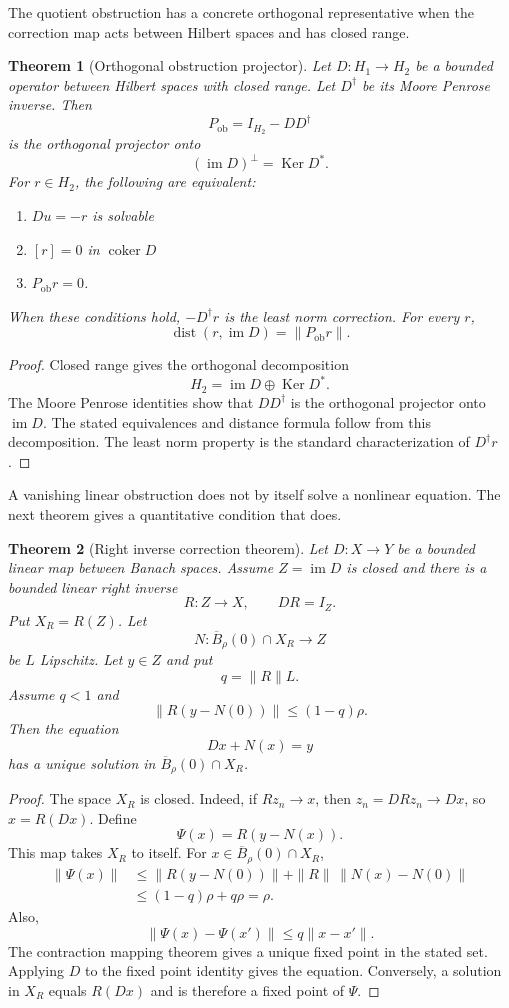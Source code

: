 \documentclass[11pt,a4paper]{article}
\newtheorem{theorem}{Theorem}[section]
\theoremstyle{plain}
\theoremstyle{definition}
\theoremstyle{remark}
\newcommand{\im}{\operatorname{im}}
\newcommand{\Ker}{\operatorname{Ker}}
\newcommand{\coker}{\operatorname{coker}}
\newcommand{\dist}{\operatorname{dist}}
\begin{document}
The quotient obstruction has a concrete orthogonal representative when the correction map acts between Hilbert spaces and has closed range.

\begin{theorem}[Orthogonal obstruction projector]\label{thm:orthogonal_obstruction}
Let $D:H_1\to H_2$ be a bounded operator between Hilbert spaces with closed range.  Let $D^\dagger$ be its Moore Penrose inverse.  Then
\[
P_{\mathrm{ob}}=I_{H_2}-DD^\dagger
\]
is the orthogonal projector onto
\[
(\im D)^\perp=\Ker D^*.
\]
For $r\in H_2$, the following are equivalent:
\begin{enumerate}
\item $Du=-r$ is solvable
\item $[r]=0$ in $\coker D$
\item $P_{\mathrm{ob}}r=0$.
\end{enumerate}
When these conditions hold, $-D^\dagger r$ is the least norm correction.  For every $r$,
\[
\dist(r,\im D)=\|P_{\mathrm{ob}}r\|.
\]
\end{theorem}

\begin{proof}
Closed range gives the orthogonal decomposition
\[
H_2=\im D\oplus\Ker D^*.
\]
The Moore Penrose identities show that $DD^\dagger$ is the orthogonal projector onto $\im D$.  The stated equivalences and distance formula follow from this decomposition.  The least norm property is the standard characterization of $D^\dagger r$.
\end{proof}

A vanishing linear obstruction does not by itself solve a nonlinear equation.  The next theorem gives a quantitative condition that does.

\begin{theorem}[Right inverse correction theorem]\label{thm:right_inverse_correction}
Let $D:X\to Y$ be a bounded linear map between Banach spaces.  Assume $Z=\im D$ is closed and there is a bounded linear right inverse
\[
R:Z\longrightarrow X,
\qquad
DR=I_Z.
\]
Put $X_R=R(Z)$.  Let
\[
N:\overline B_\rho(0)\cap X_R\longrightarrow Z
\]
be $L$ Lipschitz.  Let $y\in Z$ and put
\[
q=\|R\|L.
\]
Assume $q<1$ and
\[
\|R(y-N(0))\|
\le
(1-q)\rho.
\]
Then the equation
\[
Dx+N(x)=y
\]
has a unique solution in $\overline B_\rho(0)\cap X_R$.
\end{theorem}

\begin{proof}
The space $X_R$ is closed.  Indeed, if $Rz_n\to x$, then $z_n=DRz_n\to Dx$, so $x=R(Dx)$.  Define
\[
\Psi(x)=R(y-N(x)).
\]
This map takes $X_R$ to itself.  For $x\in\overline B_\rho(0)\cap X_R$,
\[
\begin{aligned}
\|\Psi(x)\|
&\le
\|R(y-N(0))\|
+
\|R\|\,\|N(x)-N(0)\|\\
&\le
(1-q)\rho+q\rho
=\rho.
\end{aligned}
\]
Also,
\[
\|\Psi(x)-\Psi(x')\|
\le q\|x-x'\|.
\]
The contraction mapping theorem gives a unique fixed point in the stated set.  Applying $D$ to the fixed point identity gives the equation.  Conversely, a solution in $X_R$ equals $R(Dx)$ and is therefore a fixed point of $\Psi$.
\end{proof}
\end{document}
